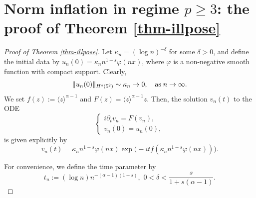 \documentclass[10pt,a4paper]{amsart}
\numberwithin{equation}{section}
\begin{document}


\section{Norm inflation in regime $p\geq3$: the proof of Theorem \ref{thm-illpose}}

\begin{proof}[Proof of Theorem \ref{thm-illpose}]
Let $\kappa_n = (\log n)^{-\delta}$ for some $\delta > 0$, and define the initial data by $u_n(0) = \kappa_n n^{1-s} \varphi(nx)$, where $\varphi$ is a non-negative smooth function with compact support. Clearly,
\begin{equation*}
\|u_n(0)\|_{H^s(\Bbb S^2)} \sim \kappa_n \to 0,\quad \text{as}\;n\to\infty.
\end{equation*}
We set $f(z) := \langle z\rangle^{\alpha-1}$ and {$F(z)=\langle z\rangle^{\alpha-1}z$}. Then, the solution $v_n(t)$ to the ODE
\begin{equation*}
\begin{cases}
i\partial_t v_n = F(v_n),\\
v_n(0) = u_n(0),
\end{cases}
\end{equation*} 
is given explicitly by
\begin{equation*}
v_n(t) = \kappa_n n^{1-s} \varphi(nx) \exp\big(-itf(\kappa_n n^{1-s} \varphi(nx))\big).
\end{equation*}
		
For convenience, we define the time parameter by
\begin{equation}\label{fml-two-para}
t_n:=(\log n)n^{-(\alpha-1)(1-s)},\,\, 0<\delta<\frac{s}{1+s(\alpha-1)}.
\end{equation}
		

\end{proof}
\end{document}
